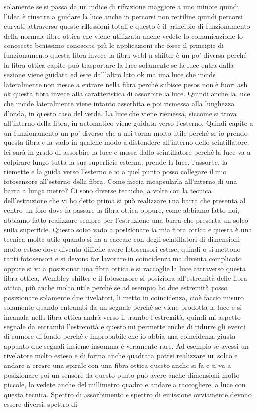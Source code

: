{solamente se si passa da un indice di rifrazione maggiore a uno minore quindi l'idea è riuscire a guidare la luce anche in percorsi non rettiline quindi percorsi curvati attraverso queste riflessioni totali e questo è il principio di funzionamento della normale fibre ottica che viene utilizzata anche vedete lo comunicazione lo conoscete benissimo conoscete più le applicazioni che fosse il principio di funzionamento questa fibra invece la fibra webl n shifter è un po' diversa perché la fibra ottica capite può trasportare la luce solamente se la luce entra dalla sezione viene guidata ed esce dall'altro lato ok ma una luce che incide lateralmente non riesce a entrare nella fibra perché subisce pesos non è fuori ash ok questa fibra invece alla caratteristica di assorbire la luce. Quindi anche la luce che incide lateralmente viene intanto assorbita e poi riemessa alla lunghezza d'onda, in questo caso del verde. La luce che viene riemessa, siccome si trova all'interno della fibra, in automatico viene guidata verso l'esterno. Quindi capite a un funzionamento un po' diverso che a noi torna molto utile perché se io prendo questa fibra e la vado in qualche modo a distendere all'interno dello scintillatore, lei sarà in grado di assorbire la luce e messa dallo scintillatore perché la luce va a colpirare lungo tutta la sua superficie esterna, prende la luce, l'assorbe, la riemette e la guida verso l'esterno e io a quel punto posso collegare il mio fotosensore all'esterno della fibra. Come faccia incapsularla all'interno di una barra a lungo metro? Ci sono diverse tecniche, a volte con la tecnica dell'estruzione che vi ho detto prima si può realizzare una barra che presenta al centro un foro dove fa passare la fibra ottica oppure, come abbiamo fatto noi, abbiamo fatto realizzare sempre per l'estruzione una barra che presenta un solco sulla superficie. Questo solco vado a posizionare la mia fibra ottica e questa è una tecnica molto utile quando si ha a caccare con degli scintillatori di dimensioni molto estese dove diventa difficile avere fotosensori estese, quindi o si mettono tanti fotosensori e si devono far lavorare in coincidenza ma diventa complicato oppure si va a posizionar una fibra ottica e si raccoglie la luce attraverso questa fibra ottica, Wembley shifter e il fotosensore si posiziona all'estremità delle fibra ottica, più anche molto utile perché se ad esempio ho due estremità posso posizionare solamente due rivelatori, li metto in coincidenza, cioè faccio misuro solamente quando entrambi da un segnale perché se viene prodotta la luce e si incanala nella fibra ottica andrà verso il trambe l'estremità, quindi mi aspetto segnale da entrambi l'estremità e questo mi permette anche di ridurre gli eventi di rumore di fondo perché è improbabile che io abbia una coincidenza giusta appunto due segnali insieme insomma è veramente raro. Ad esempio se avessi un rivelatore molto esteso e di forma anche quadrata potrei realizzare un solco e andare a creare una spirale con una fibra ottica questo anche si fa e si va a posizionare poi un sensore da questo punto può avere anche dimensioni molto piccole, lo vedete anche del millimetro quadro e andare a raccogliere la luce con questa tecnica. Spettro di assorbimento e spettro di emissione ovviamente devono essere diversi, spettro di }
